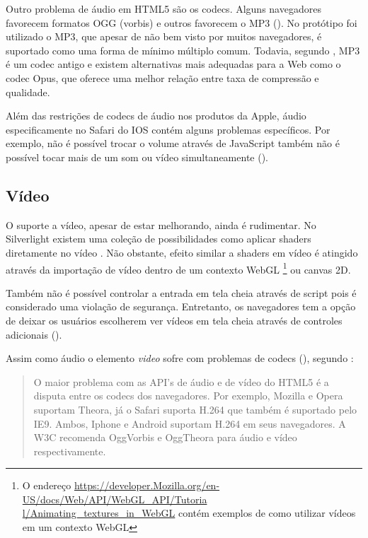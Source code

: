 Outro problema de áudio em HTML5 são os codecs. Alguns
navegadores favorecem formatos OGG (vorbis) e outros favorecem o
MP3 ().
No protótipo foi utilizado o MP3, que apesar de não bem visto por
muitos navegadores, é suportado como uma forma de mínimo múltiplo
comum. Todavia, segundo \citet{opus}, MP3 é um codec antigo e existem
alternativas mais adequadas para a Web como o codec Opus, que oferece
uma melhor relação entre taxa de compressão e qualidade.

Além das restrições de codecs de áudio nos produtos da Apple,
áudio especificamente no Safari do IOS contém alguns problemas
específicos. Por exemplo, não é possível trocar o volume
através de JavaScript também não é possível tocar mais de um
som ou vídeo simultaneamente \autocite{unsolvedMediaHtmlIssues}
().

\subsection{Vídeo}

O suporte a vídeo, apesar de estar melhorando, ainda é rudimentar.
No Silverlight existem uma coleção de possibilidades como aplicar
shaders diretamente no vídeo \autocite[p. 8]{researchOnHtml}
. Não obstante, efeito similar
a shaders em vídeo é atingido através da importação de
vídeo dentro de um contexto WebGL \footnote{O endereço
\url{https://developer.Mozilla.org/en-US/docs/Web/API/WebGL_API/Tutoria
l/Animating_textures_in_WebGL} contém exemplos de como utilizar vídeos
em um contexto WebGL} ou canvas 2D.

Também não é possível controlar a entrada em tela cheia através de
script pois é considerado uma violação de segurança. Entretanto,
os navegadores tem a opção de deixar os usuários escolherem ver
vídeos em tela cheia através de controles adicionais \autocite[p.
68]{proHtml5} ().

Assim como áudio o elemento \textit{video} sofre com problemas de
codecs (), segundo \citet{html5Tradeoffs}:
\begin{quote}
O maior problema com as API's de áudio e de vídeo do HTML5 é
a disputa entre os codecs dos navegadores. Por exemplo, Mozilla e
Opera suportam Theora, já o Safari suporta H.264 que também é
suportado pelo IE9. Ambos, Iphone e Android suportam H.264 em seus
navegadores. A W3C recomenda OggVorbis e OggTheora para áudio e vídeo
respectivamente.
\end{quote}

